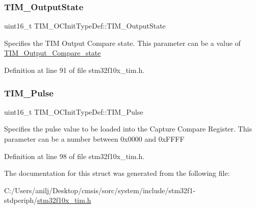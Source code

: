 \mbox{\label{struct_t_i_m___o_c_init_type_def_a2baca9c02d214d3125635a74e8d9aee4}} 
\subsubsection{\texorpdfstring{T\+I\+M\+\_\+\+Output\+State}{TIM\_OutputState}}
{\footnotesize\ttfamily uint16\+\_\+t T\+I\+M\+\_\+\+O\+C\+Init\+Type\+Def\+::\+T\+I\+M\+\_\+\+Output\+State}

Specifies the T\+IM Output Compare state. This parameter can be a value of \hyperlink{group___t_i_m___output___compare__state}{T\+I\+M\+\_\+\+Output\+\_\+\+Compare\+\_\+state} 

Definition at line 91 of file stm32f10x\+\_\+tim.\+h.

\mbox{\label{struct_t_i_m___o_c_init_type_def_a186a3729af4e52f73f96590d805412a3}} 
\subsubsection{\texorpdfstring{T\+I\+M\+\_\+\+Pulse}{TIM\_Pulse}}
{\footnotesize\ttfamily uint16\+\_\+t T\+I\+M\+\_\+\+O\+C\+Init\+Type\+Def\+::\+T\+I\+M\+\_\+\+Pulse}

Specifies the pulse value to be loaded into the Capture Compare Register. This parameter can be a number between 0x0000 and 0x\+F\+F\+FF 

Definition at line 98 of file stm32f10x\+\_\+tim.\+h.



The documentation for this struct was generated from the following file\+:\begin{DoxyCompactItemize}
\item 
C\+:/\+Users/anilj/\+Desktop/cmsis/sorc/system/include/stm32f1-\/stdperiph/\hyperlink{stm32f10x__tim_8h}{stm32f10x\+\_\+tim.\+h}\end{DoxyCompactItemize}
